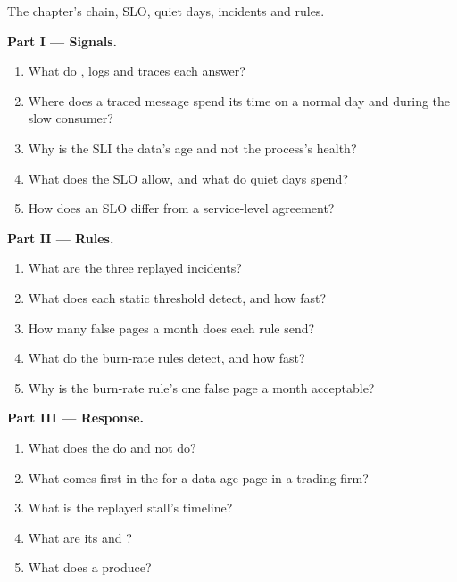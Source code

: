 \begin{problem}\label{pb:pl:observability-and-incident-response:1}
The chapter's chain, SLO, quiet days, incidents and rules.

\medskip\noindent\textbf{Part I --- Signals.}
\begin{enumerate}
\item What do , logs and traces each answer?
\item Where does a traced message spend its time on a normal day and during the slow consumer?
\item Why is the SLI the data's age and not the process's health?
\item What does the SLO allow, and what do quiet days spend?
\item How does an SLO differ from a service-level agreement?
\end{enumerate}

\medskip\noindent\textbf{Part II --- Rules.}
\begin{enumerate}[resume]
\item What are the three replayed incidents?
\item What does each static threshold detect, and how fast?
\item How many false pages a month does each rule send?
\item What do the burn-rate rules detect, and how fast?
\item Why is the burn-rate rule's one false page a month acceptable?
\end{enumerate}

\medskip\noindent\textbf{Part III --- Response.}
\begin{enumerate}[resume]
\item What does the  do and not do?
\item What comes first in the  for a data-age page in a trading firm?
\item What is the replayed stall's timeline?
\item What are its  and ?
\item What does a  produce?
\end{enumerate}


\end{problem}
